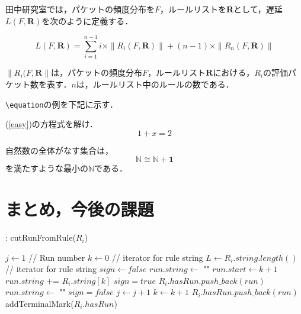 \documentclass[10pt,twocolumn]{jarticle}
\begin{document}
田中研究室では，パケットの頻度分布を$F$，ルールリストを${\mathbf R}$として，遅延$L(F, {\mathbf R})$を次のように定義する．

\[
 L(F, {\mathbf R}) = \sum_{i=1}^{n-1} i \times \| R_{i}(F, {\mathbf R})\| + (n-1) \times \| R_{n}(F, {\mathbf R})\| 
\]

$\|R_{i}(F, {\mathbf R}\|$は，パケットの頻度分布$F$，ルールリスト${\mathbf R}$における，$R_{i}$の評価パケット数を表す．$n$は，ルールリスト中のルールの数である．

\par

\verb|\equation|の例を下記に示す．\par
(\ref{easy})の方程式を解け．
\begin{equation}
 1 + x = 2
 \label{easy}
\end{equation}

自然数の全体がなす集合は，
\begin{equation}
\mathbb{N} \cong \mathbb{N} + \mathbf{1}
 \label{nat}
\end{equation}
を満たすような最小の$\mathbb{N}$である．

\section{まとめ，今後の課題}
\begin{algorithm}[H]
\caption{: cutRunFromRule($R_{i}$)}
\label{cut_run}
\begin{algorithmic}[1]
 \STATE $j \leftarrow 1$ // Run number
 \STATE $k \leftarrow 0$ // iterator for rule string
 \STATE $L \leftarrow R_{i}.string.length()$ // iterator for rule string
 \STATE $sign \leftarrow false$
 \STATE $run.string \leftarrow$ ""
    \STATE $run.start \leftarrow k + 1$
   \ENDIF
   \STATE $run.string$ += $R_{i}.string[k]$
   \STATE $sign = true$
  \ELSE                              %
    \STATE $R_{i}.hasRun.push\_back(run)$
    \STATE $run.string \leftarrow$ ""
    \STATE $sign = false$
    \STATE $j \leftarrow j + 1$
   \ENDIF
  \ENDIF
  \STATE $k \leftarrow k + 1$
 \ENDWHILE
  \STATE $R_{i}.hasRun.push\_back(run)$
 \ENDIF
\STATE addTerminalMark($R_{i}.hasRun$) 
\end{algorithmic}
\end{algorithm}
\end{document}
